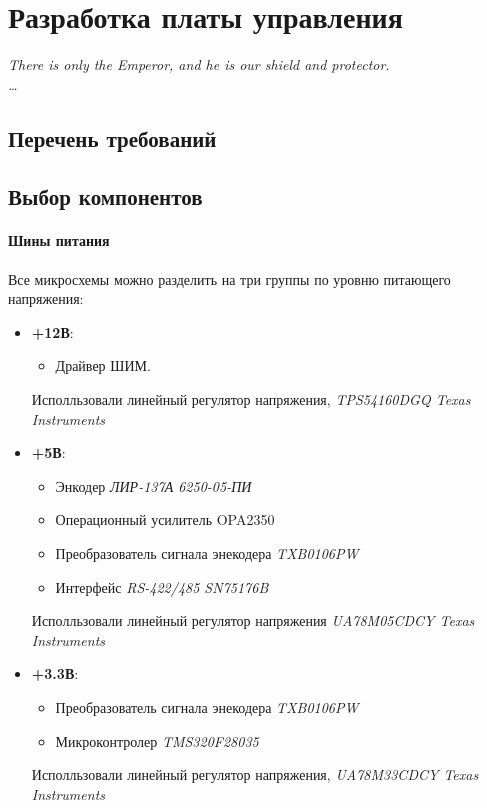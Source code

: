 \documentclass{article}
\begin{document}
\tableofcontents
\newpage
\section{Разработка платы управления}
\begin{flushright}
    \itshape
    There is only the Emperor, and he is our shield and protector.\\
    \ldots
\end{flushright}
\subsection{Перечень требований}
\subsection{Выбор компонентов}
\paragraph{Шины питания}
Все микросхемы можно разделить на три группы по уровню питающего напряжения:
\begin{itemize}
    \item \textbf{+12В}:
        \begin{itemize}
            \item Драйвер ШИМ.
        \end{itemize}
        Исполльзовали линейный регулятор напряжения, \textit{TPS54160DGQ Texas Instruments}
    \item \textbf{+5В}:
        \begin{itemize}
            \item Энкодер \textit{ЛИР-137А 6250-05-ПИ}
            \item Операционный усилитель OPA2350
            \item Преобразователь сигнала энекодера \textit{TXB0106PW}
            \item Интерфейс \textit{RS-422/485 SN75176B}
        \end{itemize}
        Исполльзовали линейный регулятор напряжения \textit{UA78M05CDCY Texas Instruments}
    \item \textbf{+3.3В}:
        \begin{itemize}
            \item Преобразователь сигнала энекодера \textit{TXB0106PW}
            \item Микроконтролер \textit{TMS320F28035}
        \end{itemize}
        Исполльзовали линейный регулятор напряжения, \textit{UA78M33CDCY Texas Instruments}
\end{itemize}
\end{document}
